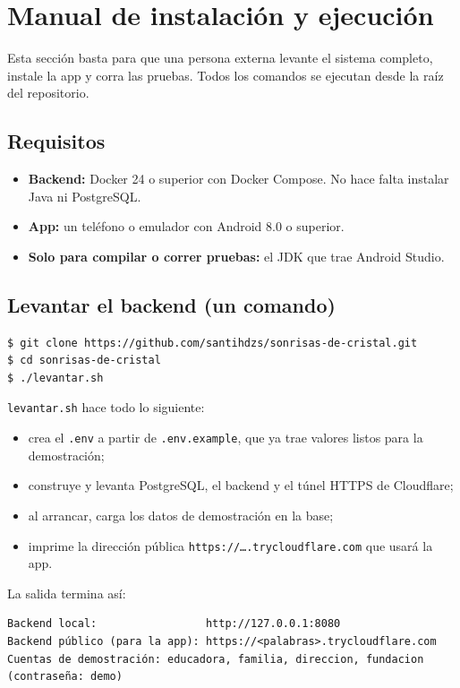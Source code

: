 \section{Manual de instalación y ejecución}\label{sec:instalacion}
Esta sección basta para que una persona externa levante el sistema completo, instale la app y corra las pruebas. Todos los comandos se ejecutan desde la raíz del repositorio.

\subsection{Requisitos}
\begin{itemize}
	\item \textbf{Backend:} Docker 24 o superior con Docker Compose. No hace falta instalar Java ni PostgreSQL.
	\item \textbf{App:} un teléfono o emulador con Android 8.0 o superior.
	\item \textbf{Solo para compilar o correr pruebas:} el JDK que trae Android Studio.
\end{itemize}

\subsection{Levantar el backend (un comando)}
\begin{lstlisting}[style=terminal]
$ git clone https://github.com/santihdzs/sonrisas-de-cristal.git
$ cd sonrisas-de-cristal
$ ./levantar.sh
\end{lstlisting}

\texttt{levantar.sh} hace todo lo siguiente:
\begin{itemize}
	\item crea el \texttt{.env} a partir de \texttt{.env.example}, que ya trae valores listos para la demostración;
	\item construye y levanta PostgreSQL, el backend y el túnel HTTPS de Cloudflare;
	\item al arrancar, carga los datos de demostración en la base;
	\item imprime la dirección pública \texttt{https://\ldots.trycloudflare.com} que usará la app.
\end{itemize}
La salida termina así:
\begin{lstlisting}[style=terminal]
Backend local:                 http://127.0.0.1:8080
Backend público (para la app): https://<palabras>.trycloudflare.com
Cuentas de demostración: educadora, familia, direccion, fundacion (contraseña: demo)
\end{lstlisting}

